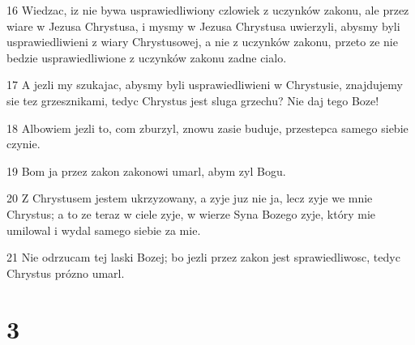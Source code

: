 \par 16 Wiedzac, iz nie bywa usprawiedliwiony czlowiek z uczynków zakonu, ale przez wiare w Jezusa Chrystusa, i mysmy w Jezusa Chrystusa uwierzyli, abysmy byli usprawiedliwieni z wiary Chrystusowej, a nie z uczynków zakonu, przeto ze nie bedzie usprawiedliwione z uczynków zakonu zadne cialo.
\par 17 A jezli my szukajac, abysmy byli usprawiedliwieni w Chrystusie, znajdujemy sie tez grzesznikami, tedyc Chrystus jest sluga grzechu? Nie daj tego Boze!
\par 18 Albowiem jezli to, com zburzyl, znowu zasie buduje, przestepca samego siebie czynie.
\par 19 Bom ja przez zakon zakonowi umarl, abym zyl Bogu.
\par 20 Z Chrystusem jestem ukrzyzowany, a zyje juz nie ja, lecz zyje we mnie Chrystus; a to ze teraz w ciele zyje, w wierze Syna Bozego zyje, który mie umilowal i wydal samego siebie za mie.
\par 21 Nie odrzucam tej laski Bozej; bo jezli przez zakon jest sprawiedliwosc, tedyc Chrystus prózno umarl.

\chapter{3}

